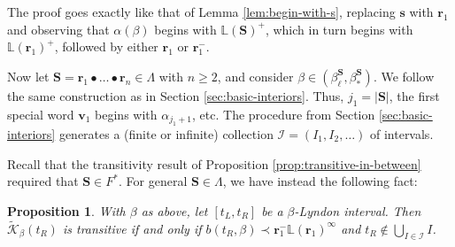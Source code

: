 \documentclass[11pt]{amsart}
\newtheorem{proposition}[theorem]{Proposition}
\theoremstyle{definition}
\theoremstyle{remark}
\numberwithin{equation}{section}
\renewcommand{\L}{\ensuremath{\mathbb{L}}}
\newcommand{\F}{F^*}
\newcommand{\II}{\mathcal{I}}
\newcommand{\Kt}{\widetilde{\mathcal{K}}}
\newcommand{\s}{ {\mathbf{s}}}
\newcommand{\cs}{ {\mathbf{S}}}
\renewcommand{\r}{ {\mathbf{r}}}
\renewcommand{\v}{\mathbf{v}}
\newcommand{\f}{\infty}
\newcommand{\al}{\alpha}
\newcommand{\La}{\Lambda}
\begin{document}
The proof goes exactly like that of Lemma \ref{lem:begin-with-s}, replacing $\s$ with $\r_1$ and observing that $\al(\beta)$ begins with $\L(\cs)^+$, which in turn begins with $\L(\r_1)^+$, followed by either $\r_1$ or $\r_1^-$.

\bigskip

Now let $\cs=\r_1\bullet\dots\bullet\r_n\in\La$ with $n\geq 2$, and consider $\beta\in(\beta_\ell^{\cs},\beta_*^{\cs})$.
We follow the same construction as in Section \ref{sec:basic-interiors}. Thus, $j_1=|\cs|$, the first special word $\v_1$ begins with $\al_{j_1+1}$, etc. The procedure from Section \ref{sec:basic-interiors} generates a (finite or infinite) collection $\II=(I_1,I_2,\dots)$ of intervals.

Recall that the transitivity result of Proposition \ref{prop:transitive-in-between} required that $\cs\in\F$. For general $\cs\in\La$, we have instead the following fact:

\begin{proposition} \label{prop:higher-basic-interval-transitivity}
With $\beta$ as above, let $[t_L,t_R]$ be a $\beta$-Lyndon interval. Then $\Kt_\beta(t_R)$ is transitive if and only if $b(t_R,\beta)\prec \r_1^-\L(\r_1)^\f$ and $t_R\not\in\bigcup_{I\in\II}I$.
\end{proposition}
\end{document}
